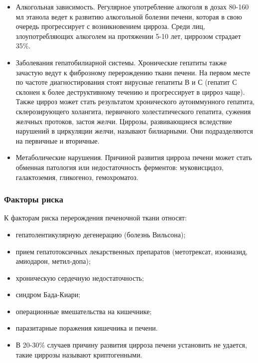\documentclass[
  11pt,
]{article}
\providecommand{\tightlist}{%
  \setlength{\itemsep}{0pt}\setlength{\parskip}{0pt}}
\begin{document}
\begin{itemize}
\item
  Алкогольная зависимость. Регулярное употребление алкоголя в дозах
  80-160 мл этанола ведет к развитию алкогольной болезни печени, которая
  в свою очередь прогрессирует с возникновением цирроза. Среди лиц,
  злоупотребляющих алкоголем на протяжении 5-10 лет, циррозом страдает
  35\%.
\item
  Заболевания гепатобилиарной системы. Хронические гепатиты также
  зачастую ведут к фиброзному перерождению ткани печени. На первом месте
  по частоте диагностирования стоят вирусные гепатиты В и С (гепатит С
  склонен к более деструктивному течению и прогрессирует в цирроз чаще).
  Также цирроз может стать результатом хронического аутоиммунного
  гепатита, склерозирующего холангита, первичного холестатического
  гепатита, сужения желчных протоков, застоя желчи. Циррозы,
  развивающиеся вследствие нарушений в циркуляции желчи, называют
  билиарными. Они подразделяются на первичные и вторичные.
\item
  Метаболические нарушения. Причиной развития цирроза печени может стать
  обменная патология или недостаточность ферментов: муковисцидоз,
  галактоземия, гликогеноз, гемохроматоз.
\end{itemize}

\hypertarget{ux444ux430ux43aux442ux43eux440ux44b-ux440ux438ux441ux43aux430}{%
\subsubsection{Факторы
риска}\label{ux444ux430ux43aux442ux43eux440ux44b-ux440ux438ux441ux43aux430}}

К факторам риска перерождения печеночной ткани относят:

\begin{itemize}
\tightlist
\item
  гепатолентикулярную дегенерацию (болезнь Вильсона);
\item
  прием гепатотоксичных лекарственных препаратов (метотрексат,
  изониазид, амиодарон, метил-допа);
\item
  хроническую сердечную недостаточность;
\item
  синдром Бада-Киари;
\item
  операционные вмешательства на кишечнике;
\item
  паразитарные поражения кишечника и печени.
\item
  В 20-30\% случаев причину развития цирроза печени установить не
  удается, такие циррозы называют криптогенными.
\end{itemize}
\end{document}

